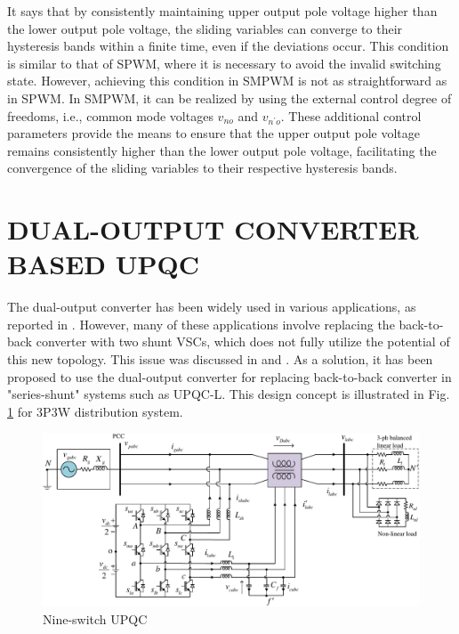 It says that by consistently maintaining upper output pole voltage higher than the lower output pole voltage, the sliding variables can converge to their hysteresis bands within a finite time, even if the deviations occur. This condition is similar to that of SPWM, where it is necessary to avoid the invalid switching state. However, achieving this condition in SMPWM is not as straightforward as in SPWM. In SMPWM, it can be realized by using the external control degree of freedoms, i.e., common mode voltages $v_{no}$ and $v_{n^{\prime}o}$. These additional control parameters provide the means to ensure that the upper output pole voltage remains consistently higher than the lower output pole voltage, facilitating the convergence of the sliding variables to their respective hysteresis bands.


\section{DUAL-OUTPUT CONVERTER BASED UPQC } \label{2.DOC_UPQC}

The dual-output converter has been widely used in various applications, as reported in \cite{4342442, 4417438, 5446393, 5754572, 5445017, 6563653, 9547678}. However, many of these applications involve replacing the back-to-back converter with two shunt VSCs, which does not fully utilize the potential of this new topology. This issue was discussed in \cite{5542338} and \cite{5713844}. As a solution, it has been proposed to use the dual-output converter for replacing back-to-back converter in "series-shunt" systems such as UPQC-L. This design concept is illustrated in Fig.\,\ref{2.NS-UPQC} for 3P3W distribution system.
\begin{figure}
	\centering	
	\includegraphics[scale=1]{figures/Chapter_6/Mine/NS_UPQC_L}
	\caption{Nine-switch UPQC}
	\label{2.NS-UPQC}
\end{figure}


